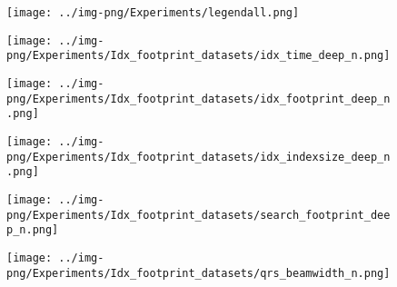 \begin{figure*}[!htb]
	\captionsetup{justification=centering}
	\centering	
	\begin{minipage}{\textwidth}
		\begin{subfigure}{\textwidth}
			\centering
			\captionsetup{justification=centering}	
			\texttt{[image: ../img-png/Experiments/legendall.png]}
		\end{subfigure}
	\end{minipage}
	\begin{minipage}{0.19\textwidth}				
			\centering
		\begin{subfigure}{\textwidth}
			\captionsetup{justification=centering}	
			\texttt{[image: ../img-png/Experiments/Idx\_footprint\_datasets/idx\_time\_deep\_n.png]}
		\end{subfigure}	
		\caption{}
		\label{fig:elpis:idx:time}
	\end{minipage}	
	\begin{minipage}{0.19\textwidth}				
		\begin{subfigure}{\textwidth}
			\centering
			\captionsetup{justification=centering}	
			\texttt{[image: ../img-png/Experiments/Idx\_footprint\_datasets/idx\_footprint\_deep\_n.png]}
		\end{subfigure}	
		\caption{}
		\label{fig:elpis:idx:footprint:memory}
	\end{minipage}		
	\begin{minipage}{0.19\textwidth}				
		\begin{subfigure}{\textwidth}
			\centering
			\captionsetup{justification=centering}	
			\texttt{[image: ../img-png/Experiments/Idx\_footprint\_datasets/idx\_indexsize\_deep\_n.png]}
		\end{subfigure}	
		\caption{}
		\label{fig:elpis:idx:footprint:disk}
	\end{minipage}		
	\begin{minipage}{0.19\textwidth}				
		\begin{subfigure}{\textwidth}
			\centering
			\captionsetup{justification=centering}	
			\texttt{[image: ../img-png/Experiments/Idx\_footprint\_datasets/search\_footprint\_deep\_n.png]}
		\end{subfigure}	
		\caption{}
		\label{fig:elpis:query:footprint:memory}
	\end{minipage}	
	\begin{minipage}{0.19\textwidth}
		\centering
		\begin{subfigure}{\textwidth}
			\texttt{[image: ../img-png/Experiments/Idx\_footprint\_datasets/qrs\_beamwidth\_n.png]}
		\end{subfigure} 
		\caption{}
		\label{fig:elpis:query:beam-width}
	\end{minipage}
\end{figure*}

